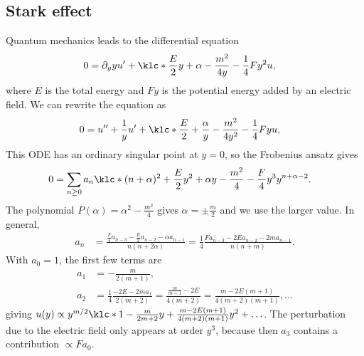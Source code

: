 \documentclass[english, parskip=full]{scrartcl}
\begin{document}
\subsection{Stark effect}
Quantum mechanics leads to the differential equation
\begin{align}
0 &= \partial_y y u' + \klc*{\frac{E}{2}y + \alpha - \frac{m^2}{4y} - \frac{1}{4} Fy^2}u,
\end{align}
where $E$ is the total energy and $Fy$ is the potential energy added by an electric field.
We can rewrite the equation as
\begin{align}
0 &= u'' + \frac{1}{y}u' + \klc*{\frac{E}{2} + \frac{\alpha}{y} - \frac{m^2}{4y^2} - \frac{1}{4} Fy}u,
\end{align}
This ODE has an ordinary singular point at $y=0$, so the Frobenius ansatz gives
\begin{align}
0 &= \sum_{n\ge 0} a_n \klc*{(n+\alpha)^2 + \frac{E}{2}y^2 + \alpha y - \frac{m^2}{4} - \frac{F}{4}y^3}y^{n+\alpha-2}.
\end{align}
The polynomial $P(\alpha) = \alpha^2 - \frac{m^2}{4}$ gives $\alpha=\pm \frac{m}{2}$ and we use the larger value.
In general,
\begin{align}
a_n &= \frac{\frac{F}{4}a_{n-3} - \frac{E}{2} a_{n-2} - \alpha a_{n-1}}{n(n+2\alpha)} = \frac{1}{4} \frac{Fa_{n-3} - 2E a_{n-2} - 2m a_{n-1}}{n(n+m)}.
\end{align}
With $a_0=1$, the first few terms are
\begin{align}
a_1 &= -\frac{m}{2(m+1)},\\
a_2 &= \frac{1}{4} \frac{-2E-2ma_1}{2(m+2)} = \frac{\frac{m}{m+1} - 2E }{4(m+2)} = \frac{m - 2E (m+1) }{4(m+2)(m+1)}, \dots
\end{align}
giving $u(y) \propto y^{m/2} \klc*{1 - \frac{m}{2m+2} y + \frac{m - 2E (m+1) }{4(m+2)(m+1)} y^2 + \dots}$.
The perturbation due to the electric field only appears at order $y^3$, because then $a_3$ contains a contribution $\propto Fa_0$.
\end{document}

